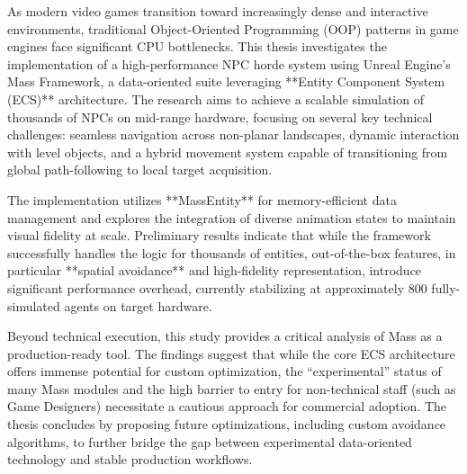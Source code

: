 As modern video games transition toward increasingly dense and interactive environments, traditional Object-Oriented Programming (OOP) patterns in game engines face significant CPU bottlenecks. This thesis investigates the implementation of a high-performance NPC horde system using Unreal Engine’s Mass Framework, a data-oriented suite leveraging **Entity Component System (ECS)** architecture. The research aims to achieve a scalable simulation of thousands of NPCs on mid-range hardware, focusing on several key technical challenges: seamless navigation across non-planar landscapes, dynamic interaction with level objects, and a hybrid movement system capable of transitioning from global path-following to local target acquisition.

The implementation utilizes **MassEntity** for memory-efficient data management and explores the integration of diverse animation states to maintain visual fidelity at scale. Preliminary results indicate that while the framework successfully handles the logic for thousands of entities, out-of-the-box features, in particular **spatial avoidance** and high-fidelity representation, introduce significant performance overhead, currently stabilizing at approximately 800 fully-simulated agents on target hardware.

Beyond technical execution, this study provides a critical analysis of Mass as a production-ready tool. The findings suggest that while the core ECS architecture offers immense potential for custom optimization, the “experimental” status of many Mass modules and the high barrier to entry for non-technical staff (such as Game Designers) necessitate a cautious approach for commercial adoption. The thesis concludes by proposing future optimizations, including custom avoidance algorithms, to further bridge the gap between experimental data-oriented technology and stable production workflows.
